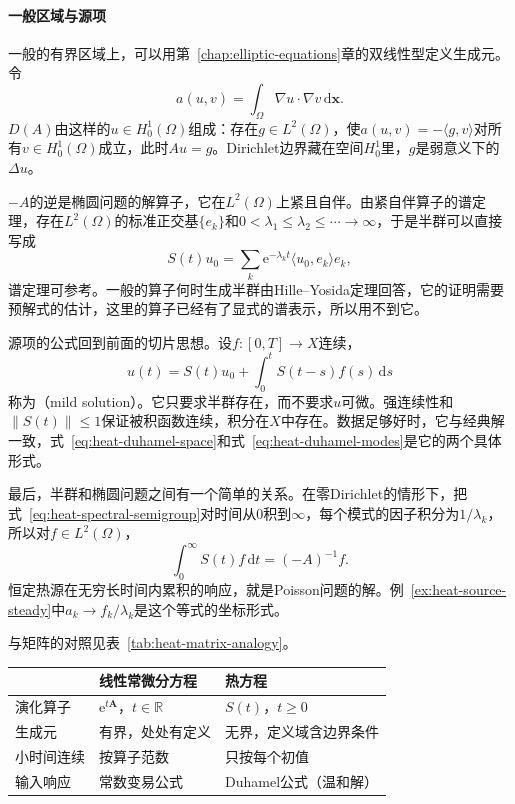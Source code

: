 \paragraph{一般区域与源项}
一般的有界区域上，可以用第~\ref{chap:elliptic-equations}章的双线性型定义生成元。令
\[
 a(u,v)=\int_\Omega\nabla u\cdot\nabla v\,\mathrm{d}\bm{x} .
\]
$D(A)$由这样的$u\in H^1_0(\Omega)$组成：存在$g\in L^2(\Omega)$，使$a(u,v)=-\langle g,v\rangle$对所有$v\in H^1_0(\Omega)$成立，此时$Au=g$。Dirichlet边界藏在空间$H^1_0$里，$g$是弱意义下的$\Delta u$。

$-A$的逆是椭圆问题的解算子，它在$L^2(\Omega)$上紧且自伴。由紧自伴算子的谱定理，存在$L^2(\Omega)$的标准正交基$\{e_k\}$和$0<\lambda_1\leq\lambda_2\leq\cdots\to\infty$，于是半群可以直接写成
\begin{equation}
 S(t)u_0=\sum_k\mathrm{e}^{-\lambda_kt}\langle u_0,e_k\rangle e_k ,
 \label{eq:heat-spectral-semigroup}
\end{equation}
谱定理可参考。一般的算子何时生成半群由Hille--Yosida定理回答，它的证明需要预解式的估计，这里的算子已经有了显式的谱表示，所以用不到它。

源项的公式回到前面的切片思想。设$f:[0,T]\to X$连续，
\begin{equation}
 u(t)=S(t)u_0+\int_0^tS(t-s)f(s)\,\mathrm{d}s
 \label{eq:heat-mild}
\end{equation}
称为（mild solution）。它只要求半群存在，而不要求$u$可微。强连续性和$\lVert S(t)\rVert\leq1$保证被积函数连续，积分在$X$中存在。数据足够好时，它与经典解一致，式~\eqref{eq:heat-duhamel-space}和式~\eqref{eq:heat-duhamel-modes}是它的两个具体形式。

最后，半群和椭圆问题之间有一个简单的关系。在零Dirichlet的情形下，把式~\eqref{eq:heat-spectral-semigroup}对时间从$0$积到$\infty$，每个模式的因子积分为$1/\lambda_k$，所以对$f\in L^2(\Omega)$，
\[
 \int_0^\infty S(t)f\,\mathrm{d}t=(-A)^{-1}f .
\]
恒定热源在无穷长时间内累积的响应，就是Poisson问题的解。例~\ref{ex:heat-source-steady}中$a_k\to f_k/\lambda_k$是这个等式的坐标形式。

与矩阵的对照见表~\ref{tab:heat-matrix-analogy}。

\begin{BookInlineTable}
  \centering
  \caption{矩阵指数与热半群的对照。}
  \label{tab:heat-matrix-analogy}
  \begin{tabular}{lll}
    \toprule
    & 线性常微分方程 & 热方程\\
    \midrule
    演化算子 & $\mathrm{e}^{t\bm{A}}$，$t\in\mathbb{R}$ & $S(t)$，$t\geq0$\\
    生成元 & 有界，处处有定义 & 无界，定义域含边界条件\\
    小时间连续 & 按算子范数 & 只按每个初值\\
    输入响应 & 常数变易公式 & Duhamel公式（温和解）\\
    \bottomrule
  \end{tabular}
\end{BookInlineTable}

